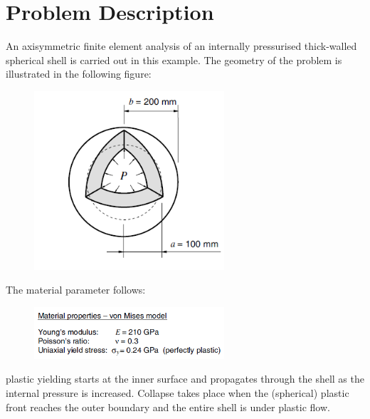 \documentclass{article}
\begin{document}
\section{Problem Description}
An axisymmetric finite element analysis of an internally pressurised thick-walled spherical
shell is carried out in this example. The geometry of the problem is illustrated in the following figure:
\begin{figure}[!ht]
\center
\includegraphics[width=200pt]{illustration_hollow_sphere.png}
\end{figure}

The material parameter follows:
\begin{figure}[!ht]
\center
\includegraphics[width=200pt]{material_parameter.png}
\end{figure}

plastic yielding starts at the inner surface and
propagates through the shell as the internal pressure is increased. Collapse takes place when
the (spherical) plastic front reaches the outer boundary and the entire shell is under plastic
flow.
\end{document}
